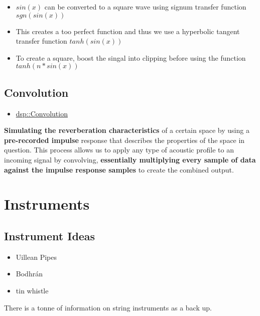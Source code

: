 \documentclass{article}
\begin{document}
	
	\begin{itemize}
		\item $sin(x)$ can be converted to a square wave using signum transfer function $sgn(sin(x))$
		\item This creates a too perfect function and thus we use a hyperbolic tangent transfer function $tanh(sin(x))$
		\item To create a square, boost the singal into clipping before using the function $tanh(n*sin(x))$
	\end{itemize}
	
	\subsection{Convolution}
	\begin{itemize}
		\item \href{https://docs.juce.com/master/classdsp_1_1Convolution.html}{dsp::Convolution}
	\end{itemize}
	\textbf{Simulating the reverberation characteristics} of a certain space by using a \textbf{pre-recorded impulse} response that describes the properties of the space in question. This process allows us to apply any type of acoustic profile to an incoming signal by convolving, \textbf{essentially multiplying every sample of data against the impulse response samples} to create the combined output.

\section{Instruments}
	\subsection{Instrument Ideas}
	\begin{itemize}
		\item Uillean Pipes
		\item Bodhrán
		\item tin whistle
	\end{itemize}
	There is a tonne of information on string instruments as a back up.
	
\end{document}
